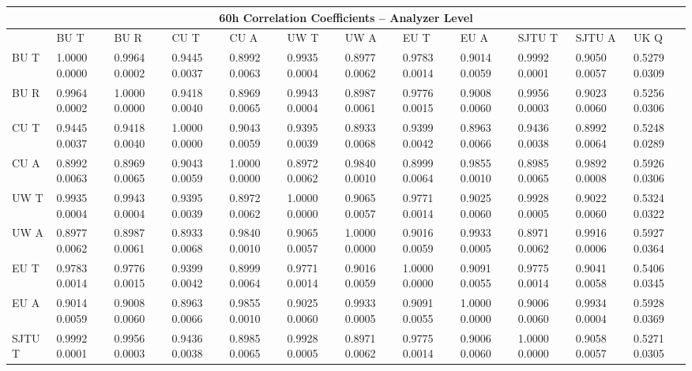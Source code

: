 
\begin{landscape}
\begin{table}
\small
\centering
\renewcommand{\arraystretch}{1.5}
\begin{tabularx}{1\linewidth}{@{\extracolsep{\fill}}lXXXXXXXXXXX}
  \toprule
  	\multicolumn{12}{c}{{\normalsize 60h Correlation Coefficients -- Analyzer Level}} \\
  \midrule
  	       & BU T & BU R & CU T & CU A & UW T & UW A & EU T & EU A & SJTU T & SJTU A & UK Q \\
  \midrule
	BU T   & 1.0000 0.0000 & 0.9964 0.0002 & 0.9445 0.0037 & 0.8992 0.0063 & 0.9935 0.0004 & 0.8977 0.0062 & 0.9783 0.0014 & 0.9014 0.0059 & 0.9992 0.0001 & 0.9050 0.0057 & 0.5279 0.0309  \\
	BU R   & 0.9964 0.0002 & 1.0000 0.0000 & 0.9418 0.0040 & 0.8969 0.0065 & 0.9943 0.0004 & 0.8987 0.0061 & 0.9776 0.0015 & 0.9008 0.0060 & 0.9956 0.0003 & 0.9023 0.0060 & 0.5256 0.0306  \\
	CU T   & 0.9445 0.0037 & 0.9418 0.0040 & 1.0000 0.0000 & 0.9043 0.0059 & 0.9395 0.0039 & 0.8933 0.0068 & 0.9399 0.0042 & 0.8963 0.0066 & 0.9436 0.0038 & 0.8992 0.0064 & 0.5248 0.0289  \\
	CU A   & 0.8992 0.0063 & 0.8969 0.0065 & 0.9043 0.0059 & 1.0000 0.0000 & 0.8972 0.0062 & 0.9840 0.0010 & 0.8999 0.0064 & 0.9855 0.0010 & 0.8985 0.0065 & 0.9892 0.0008 & 0.5926 0.0306  \\
	UW T   & 0.9935 0.0004 & 0.9943 0.0004 & 0.9395 0.0039 & 0.8972 0.0062 & 1.0000 0.0000 & 0.9065 0.0057 & 0.9771 0.0014 & 0.9025 0.0060 & 0.9928 0.0005 & 0.9022 0.0060 & 0.5324 0.0322  \\
	UW A   & 0.8977 0.0062 & 0.8987 0.0061 & 0.8933 0.0068 & 0.9840 0.0010 & 0.9065 0.0057 & 1.0000 0.0000 & 0.9016 0.0059 & 0.9933 0.0005 & 0.8971 0.0062 & 0.9916 0.0006 & 0.5927 0.0364  \\
	EU T   & 0.9783 0.0014 & 0.9776 0.0015 & 0.9399 0.0042 & 0.8999 0.0064 & 0.9771 0.0014 & 0.9016 0.0059 & 1.0000 0.0000 & 0.9091 0.0055 & 0.9775 0.0014 & 0.9041 0.0058 & 0.5406 0.0345  \\
	EU A   & 0.9014 0.0059 & 0.9008 0.0060 & 0.8963 0.0066 & 0.9855 0.0010 & 0.9025 0.0060 & 0.9933 0.0005 & 0.9091 0.0055 & 1.0000 0.0000 & 0.9006 0.0060 & 0.9934 0.0004 & 0.5928 0.0369  \\
	SJTU T & 0.9992 0.0001 & 0.9956 0.0003 & 0.9436 0.0038 & 0.8985 0.0065 & 0.9928 0.0005 & 0.8971 0.0062 & 0.9775 0.0014 & 0.9006 0.0060 & 1.0000 0.0000 & 0.9058 0.0057 & 0.5271 0.0305  \\

\end{tabularx}
\end{table}
\end{landscape}

